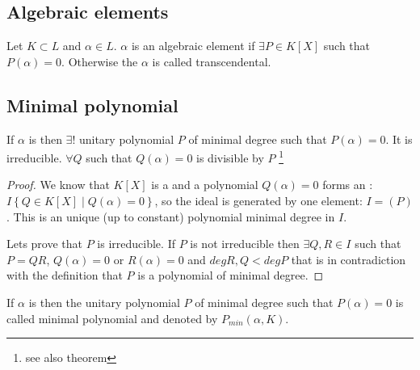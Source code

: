 \subsection{Algebraic elements}

\begin{definition}
  Let $K \subset L$ and $\alpha \in L$. $\alpha$ is an algebraic
  element if $\exists P \in K\left[X\right]$ such that
    $P\left(\alpha\right) = 0$. Otherwise the $\alpha$ is called
    transcendental.
  \label{def:algebraicelement}
\end{definition}

\subsection{Minimal polynomial}

\begin{lemma}
  If $\alpha$ is  then
  $\exists!$ unitary polynomial $P$ of minimal degree such that
  $P\left(\alpha\right) = 0$. It is irreducible. $\forall Q$ such that
  $Q\left(\alpha\right) = 0$ is divisible by $P$
  \footnote{
    see also theorem 
  }
  \begin{proof}
    We know that $K\left[X\right]$ is a  and a
    polynomial $Q\left(\alpha\right) = 0$ forms an
    : $I \left\{Q \in K\left[X\right] \mid
    Q\left(\alpha\right) = 0 \right\}$, so the ideal is generated by
    one element: $I = \left(P\right)$. This is an unique (up to
    constant) polynomial minimal degree in $I$.
    
    Lets prove that $P$ is irreducible. If $P$ is not irreducible then
    $\exists Q,R \in I$ such that $P = Q 
    R$, $Q(\alpha) = 0$ or $R(\alpha) = 0$ and
    $deg R,Q < deg P$ that is in contradiction with the definition
    that $P$ is a polynomial of minimal degree.    
  \end{proof}
  \label{lem:minpolynomial}
\end{lemma}

\begin{definition}
  If $\alpha$ is  then
  the unitary polynomial $P$ of minimal degree such that
  $P\left(\alpha\right) = 0$ is called minimal polynomial and denoted
  by  $P_{min}\left(\alpha, K\right)$.
  \label{def:minpolynomial}
\end{definition}


